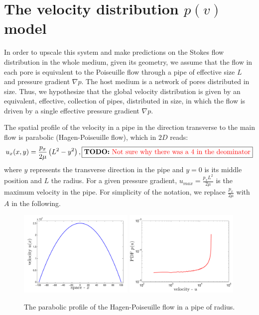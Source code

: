 \documentclass[onecolumn,showpacs,pre,preprintnumbers,floatfix]{revtex4-1}
\newcommand{\todo}[1]{\fbox{{\bf TODO:} \color{red} #1}}
\begin{document}
\section{The velocity distribution $p(v)$ model}
In order to upscale this system and make predictions on the Stokes flow
distribution in the whole medium, given its geometry, we assume that the
flow in each pore is equivalent to the Poiseuille flow through a pipe of
effective size $L$ and pressure gradient $\nabla p$. The host medium is
a network of pores distributed in size. Thus, we hypothesize that the
global velocity distribution is given by an equivalent, effective,
collection of pipes, distributed in size, in which the flow is driven by
a single effective pressure gradient $\nabla p$.

The spatial profile of the velocity in a pipe in the direction
transverse to the main flow is parabolic (Hagen-Poiseuille flow), which
in $2D$ reads:
%
\begin{align}
  u_{x}(x,y) = \frac{p_{x}}{2\mu} \left(L^2 - y^2 \right),
  \label{e:poiseuille}
  \todo{Not sure why there was a 4 in the deominator}
\end{align}
%
where $y$ represents the transverse direction in the pipe and $y = 0$ is
its middle position and $L$ the radius. For a given pressure gradient,
$u_{max} = \frac{p_{x}L^{2}}{2\mu}$ is the maximum velocity in the pipe.
For simplicity of the notation, we replace $\frac{p_{x}}{2\mu}$ with $A$
in the following.
%
\begin{figure}[h!]
  \begin{center}
  \includegraphics[width=0.49\textwidth]{./images/u.pdf} 
  \includegraphics[width=0.49\textwidth]{./images/pdf_u2.pdf}
  \caption{The parabolic profile of the Hagen-Poiseuille flow in a pipe
  of radius.}\label{f:HPflow}
  \end{center}
\end{figure}
\end{document}
